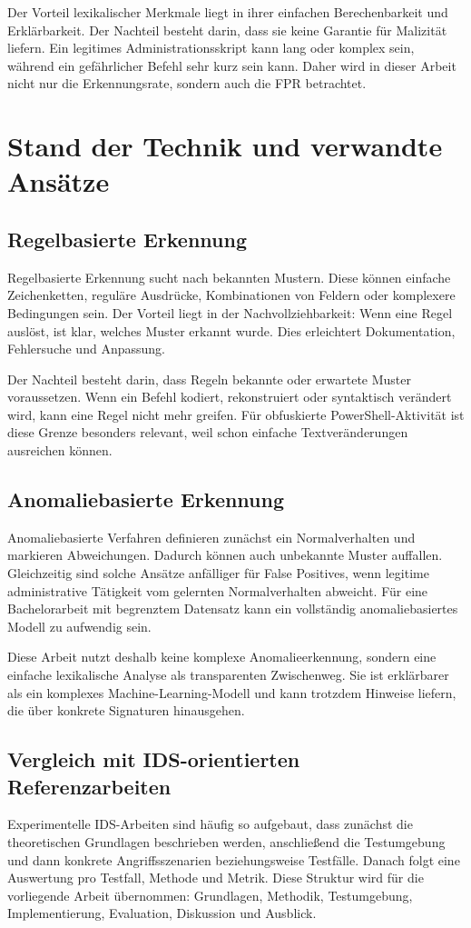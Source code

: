 \documentclass[12pt,a4paper,oneside,parskip=half]{scrreprt}
\begin{document}
Der Vorteil lexikalischer Merkmale liegt in ihrer einfachen Berechenbarkeit und Erklärbarkeit. Der Nachteil besteht darin, dass sie keine Garantie für Malizität liefern. Ein legitimes Administrationsskript kann lang oder komplex sein, während ein gefährlicher Befehl sehr kurz sein kann. Daher wird in dieser Arbeit nicht nur die Erkennungsrate, sondern auch die FPR betrachtet.

\chapter{Stand der Technik und verwandte Ansätze}

\section{Regelbasierte Erkennung}
Regelbasierte Erkennung sucht nach bekannten Mustern. Diese können einfache Zeichenketten, reguläre Ausdrücke, Kombinationen von Feldern oder komplexere Bedingungen sein. Der Vorteil liegt in der Nachvollziehbarkeit: Wenn eine Regel auslöst, ist klar, welches Muster erkannt wurde. Dies erleichtert Dokumentation, Fehlersuche und Anpassung.

Der Nachteil besteht darin, dass Regeln bekannte oder erwartete Muster voraussetzen. Wenn ein Befehl kodiert, rekonstruiert oder syntaktisch verändert wird, kann eine Regel nicht mehr greifen. Für obfuskierte PowerShell-Aktivität ist diese Grenze besonders relevant, weil schon einfache Textveränderungen ausreichen können.

\section{Anomaliebasierte Erkennung}
Anomaliebasierte Verfahren definieren zunächst ein Normalverhalten und markieren Abweichungen. Dadurch können auch unbekannte Muster auffallen. Gleichzeitig sind solche Ansätze anfälliger für False Positives, wenn legitime administrative Tätigkeit vom gelernten Normalverhalten abweicht. Für eine Bachelorarbeit mit begrenztem Datensatz kann ein vollständig anomaliebasiertes Modell zu aufwendig sein.

Diese Arbeit nutzt deshalb keine komplexe Anomalieerkennung, sondern eine einfache lexikalische Analyse als transparenten Zwischenweg. Sie ist erklärbarer als ein komplexes Machine-Learning-Modell und kann trotzdem Hinweise liefern, die über konkrete Signaturen hinausgehen.

\section{Vergleich mit IDS-orientierten Referenzarbeiten}
Experimentelle IDS-Arbeiten sind häufig so aufgebaut, dass zunächst die theoretischen Grundlagen beschrieben werden, anschließend die Testumgebung und dann konkrete Angriffsszenarien beziehungsweise Testfälle. Danach folgt eine Auswertung pro Testfall, Methode und Metrik. Diese Struktur wird für die vorliegende Arbeit übernommen: Grundlagen, Methodik, Testumgebung, Implementierung, Evaluation, Diskussion und Ausblick.
\end{document}
